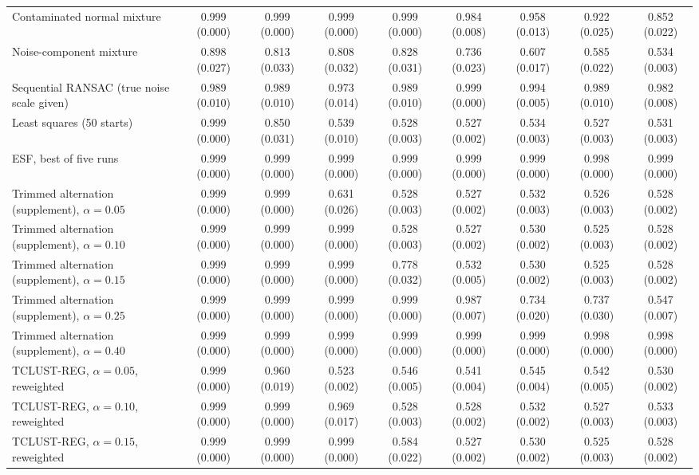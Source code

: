 \begin{table}[htbp]
{\begin{tabular}{lcccccccc}
Contaminated normal mixture & 0.999 (0.000) & 0.999 (0.000) & 0.999 (0.000) & 0.999 (0.000) & 0.984 (0.008) & 0.958 (0.013) & 0.922 (0.025) & 0.852 (0.022) \\
Noise-component mixture & 0.898 (0.027) & 0.813 (0.033) & 0.808 (0.032) & 0.828 (0.031) & 0.736 (0.023) & 0.607 (0.017) & 0.585 (0.022) & 0.534 (0.003) \\
Sequential RANSAC (true noise scale given) & 0.989 (0.010) & 0.989 (0.010) & 0.973 (0.014) & 0.989 (0.010) & 0.999 (0.000) & 0.994 (0.005) & 0.989 (0.010) & 0.982 (0.008) \\
Least squares (50 starts) & 0.999 (0.000) & 0.850 (0.031) & 0.539 (0.010) & 0.528 (0.003) & 0.527 (0.002) & 0.534 (0.003) & 0.527 (0.003) & 0.531 (0.003) \\
ESF, best of five runs & 0.999 (0.000) & 0.999 (0.000) & 0.999 (0.000) & 0.999 (0.000) & 0.999 (0.000) & 0.999 (0.000) & 0.998 (0.000) & 0.999 (0.000) \\
Trimmed alternation (supplement), $\alpha=0.05$ & 0.999 (0.000) & 0.999 (0.000) & 0.631 (0.026) & 0.528 (0.003) & 0.527 (0.002) & 0.532 (0.003) & 0.526 (0.003) & 0.528 (0.002) \\
Trimmed alternation (supplement), $\alpha=0.10$ & 0.999 (0.000) & 0.999 (0.000) & 0.999 (0.000) & 0.528 (0.003) & 0.527 (0.002) & 0.530 (0.002) & 0.525 (0.003) & 0.528 (0.002) \\
Trimmed alternation (supplement), $\alpha=0.15$ & 0.999 (0.000) & 0.999 (0.000) & 0.999 (0.000) & 0.778 (0.032) & 0.532 (0.005) & 0.530 (0.002) & 0.525 (0.003) & 0.528 (0.002) \\
Trimmed alternation (supplement), $\alpha=0.25$ & 0.999 (0.000) & 0.999 (0.000) & 0.999 (0.000) & 0.999 (0.000) & 0.987 (0.007) & 0.734 (0.020) & 0.737 (0.030) & 0.547 (0.007) \\
Trimmed alternation (supplement), $\alpha=0.40$ & 0.999 (0.000) & 0.999 (0.000) & 0.999 (0.000) & 0.999 (0.000) & 0.999 (0.000) & 0.999 (0.000) & 0.998 (0.000) & 0.998 (0.000) \\
TCLUST-REG, $\alpha=0.05$, reweighted & 0.999 (0.000) & 0.960 (0.019) & 0.523 (0.002) & 0.546 (0.005) & 0.541 (0.004) & 0.545 (0.004) & 0.542 (0.005) & 0.530 (0.002) \\
TCLUST-REG, $\alpha=0.10$, reweighted & 0.999 (0.000) & 0.999 (0.000) & 0.969 (0.017) & 0.528 (0.003) & 0.528 (0.002) & 0.532 (0.002) & 0.527 (0.003) & 0.533 (0.003) \\
TCLUST-REG, $\alpha=0.15$, reweighted & 0.999 (0.000) & 0.999 (0.000) & 0.999 (0.000) & 0.584 (0.022) & 0.527 (0.002) & 0.530 (0.002) & 0.525 (0.003) & 0.528 (0.002) \\
\bottomrule
\end{tabular}}
\end{table}


